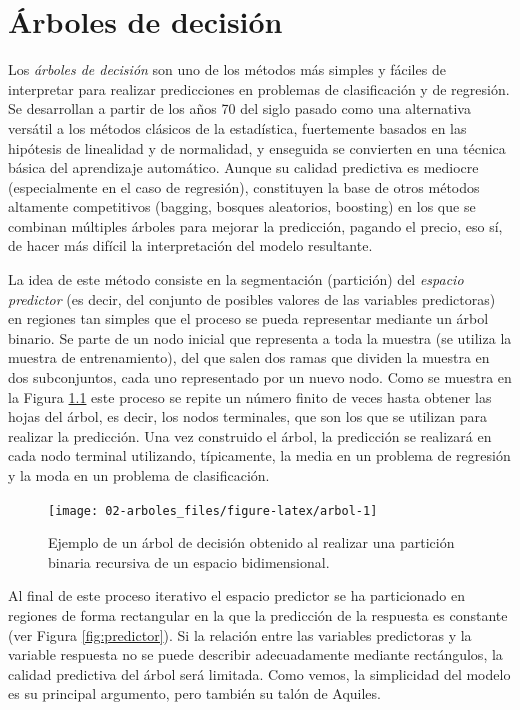 \documentclass[
  spanish,
]{book}
\theoremstyle{break}
\theoremstyle{definition}
\theoremstyle{definition}
\theoremstyle{definition}
\theoremstyle{definition}
\theoremstyle{remark}
\begin{document}
\hypertarget{trees}{%
\chapter{Árboles de decisión}\label{trees}}

Los \emph{árboles de decisión} son uno de los métodos más simples y fáciles de interpretar para realizar predicciones en problemas de clasificación y de regresión.
Se desarrollan a partir de los años 70 del siglo pasado como una alternativa versátil a los métodos clásicos de la estadística, fuertemente basados en las hipótesis de linealidad y de normalidad, y enseguida se convierten en una técnica básica del aprendizaje automático.
Aunque su calidad predictiva es mediocre (especialmente en el caso de regresión), constituyen la base de otros métodos altamente competitivos (bagging, bosques aleatorios, boosting) en los que se combinan múltiples árboles para mejorar la predicción, pagando el precio, eso sí, de hacer más difícil la interpretación del modelo resultante.

La idea de este método consiste en la segmentación (partición) del \emph{espacio predictor} (es decir, del conjunto de posibles valores de las variables predictoras) en regiones tan simples que el proceso se pueda representar mediante un árbol binario.
Se parte de un nodo inicial que representa a toda la muestra (se utiliza la muestra de entrenamiento), del que salen dos ramas que dividen la muestra en dos subconjuntos, cada uno representado por un nuevo nodo.
Como se muestra en la Figura \ref{fig:arbol} este proceso se repite un número finito de veces hasta obtener las hojas del árbol, es decir, los nodos terminales, que son los que se utilizan para realizar la predicción.
Una vez construido el árbol, la predicción se realizará en cada nodo terminal utilizando, típicamente, la media en un problema de regresión y la moda en un problema de clasificación.

\begin{figure}[!htb]

{\centering \texttt{[image: 02-arboles\_files/figure-latex/arbol-1]} 

}

\caption{Ejemplo de un árbol de decisión obtenido al realizar una partición binaria recursiva de un espacio bidimensional.}\label{fig:arbol}
\end{figure}

Al final de este proceso iterativo el espacio predictor se ha particionado en regiones de forma rectangular en la que la predicción de la respuesta es constante (ver Figura \ref{fig:predictor}).
Si la relación entre las variables predictoras y la variable respuesta no se puede describir adecuadamente mediante rectángulos, la calidad predictiva del árbol será limitada.
Como vemos, la simplicidad del modelo es su principal argumento, pero también su talón de Aquiles.
\end{document}
